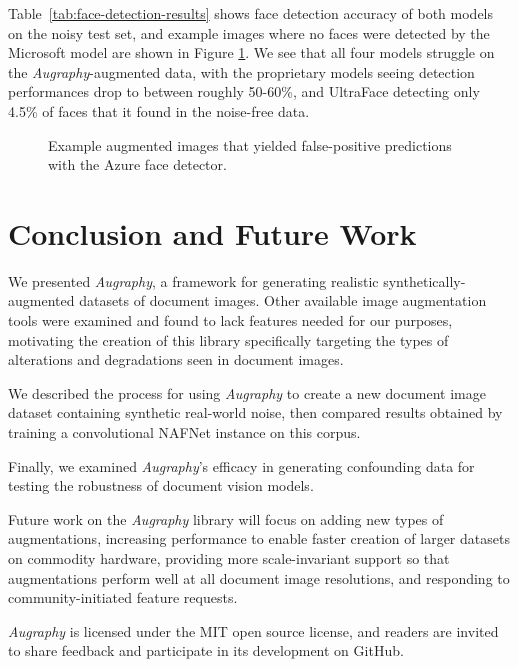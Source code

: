 \documentclass[runningheads]{llncs}
\begin{document}
Table~\ref{tab:face-detection-results} shows face detection accuracy of both models on the noisy test set, and example images where no faces were detected by the Microsoft model are shown in Figure \ref{fig:face-detection-mistakes}.
We see that all four models struggle on the \emph{Augraphy}-augmented data, with the proprietary models seeing detection performances drop to between roughly 50-60\%, and UltraFace detecting only 4.5\% of faces that it found in the noise-free data.

\begin{figure}
    \centering{}
    \caption{Example augmented images that yielded false-positive predictions with the Azure face detector.}
    \label{fig:face-detection-mistakes}
\end{figure}

\section{Conclusion and Future Work}
We presented \emph{Augraphy}, a framework for generating realistic synthetically-augmented datasets of document images.
Other available image augmentation tools were examined and found to lack features needed for our purposes, motivating the creation of this library specifically targeting the types of alterations and degradations seen in document images.

We described the process for using \emph{Augraphy} to create a new document image dataset containing synthetic real-world noise, then compared results obtained by training a convolutional NAFNet instance on this corpus.

Finally, we examined \emph{Augraphy}'s efficacy in generating confounding data for testing the robustness of document vision models.

Future work on the \emph{Augraphy} library will focus on adding new types of augmentations, increasing performance to enable faster creation of larger datasets on commodity hardware, providing more scale-invariant support so that augmentations perform well at all document image resolutions, and responding to community-initiated feature requests.

\emph{Augraphy} is licensed under the MIT open source license, and readers are invited to share feedback and participate in its development on GitHub.


%
%
%


\end{document}
